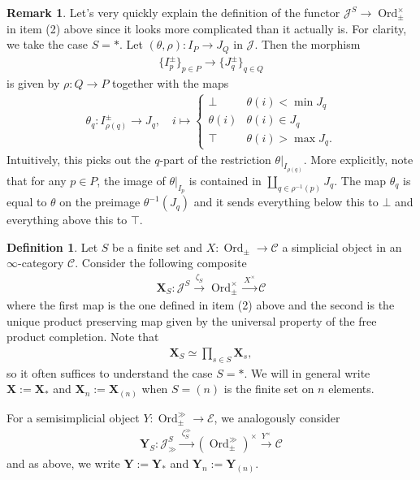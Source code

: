 \documentclass[12pt, reqno]{amsart}
\theoremstyle{plain}
\theoremstyle{definition}
\newtheorem{definition}[theorem]{Definition}
\newtheorem{remark}[theorem]{Remark}
\begin{document}
\begin{remark}\label{motivate functor JS to Ord}
Let's very quickly explain the definition of the functor $\mathcal{J}^S\rightarrow \operatorname{Ord}_\pm^\times$ in item (2) above since it looks more complicated than it actually is. For clarity, we take the case $S=\ast$. Let $(\theta,\rho)\colon I_P\rightarrow J_Q$ in $\mathcal{J}$. Then the morphism
\begin{align*}
\{I_p^\pm\}_{p\in P}\rightarrow \{J_q^\pm\}_{q\in Q}
\end{align*}
is given by $\rho\colon Q\rightarrow P$ together with the maps
\begin{align*}
\theta_q\colon I_{\rho(q)}^\pm \rightarrow J_q,\quad
i\mapsto \begin{cases}
\bot & \theta(i)< \min J_q \\
\theta(i) & \theta(i)\in J_q \\
\top & \theta(i)> \max J_q.
\end{cases}
\end{align*}
Intuitively, this picks out the $q$-part of the restriction $\theta|_{I_{\rho(q)}}$. More explicitly, note that for any $p\in P$, the image of $\theta|_{I_p}$ is contained in $\coprod_{q\in \rho^{-1}(p)} J_q$. The map $\theta_q$ is equal to $\theta$ on the preimage $\theta^{-1}(J_q)$ and it sends everything below this to $\bot$ and everything above this to $\top$.
\end{remark}

\begin{definition}\label{simplicial space out of J-category}
Let $S$ be a finite set and $X\colon \operatorname{Ord}_\pm\rightarrow \mathcal{C}$ a simplicial object in an $\infty$-category $\mathcal{C}$. Consider the following composite
\begin{align*}
\mathbf{X}_S\colon \mathcal{J}^S\xrightarrow{\ \zeta_S\ } \operatorname{Ord}_\pm^\times\xrightarrow{X^\times} \mathcal{C}
\end{align*}
where the first map is the one defined in item (2) above and the second is the unique product preserving map given by the universal property of the free product completion. Note that
\begin{align*}
\mathbf{X}_S\simeq\prod_{s\in S}\mathbf{X}_s,
\end{align*}
so it often suffices to understand the case $S=\ast$. We will in general write $\mathbf{X}:=\mathbf{X}_\ast$ and $\mathbf{X}_n:=\mathbf{X}_{(n)}$ when $S=(n)$ is the finite set on $n$ elements.

For a semisimplicial object $Y\colon \operatorname{Ord}_\pm^\gg\rightarrow \mathcal{E}$, we analogously consider
\begin{align*}
\mathbf{Y}_S\colon \mathcal{J}_\gg^S\xrightarrow{\ \zeta_S^\gg\ }( \operatorname{Ord}_\pm^\gg)^\times\xrightarrow{Y^\times} \mathcal{C}
\end{align*}
and as above, we write $\mathbf{Y}:=\mathbf{Y}_\ast$  and $\mathbf{Y}_n:=\mathbf{Y}_{(n)}$.
\end{definition}
\end{document}
